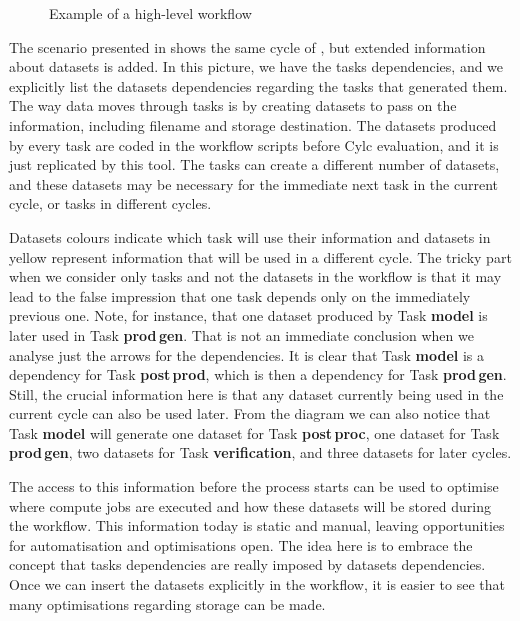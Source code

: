 \documentclass{superfri}
\begin{document}
\begin{figure}[b]
\begin{minipage}{.45\linewidth}
        \label{fig:cycle-io-dep}
    \end{minipage}
    \vspace{5pt}
    \caption{Example of a high-level workflow}
    \label{fig:cycle}
\end{figure}

The scenario presented in  shows the same cycle of , but  extended information about datasets is added.
In this picture, we have the tasks dependencies, and we explicitly list the datasets dependencies regarding the tasks that generated them.
The way data moves through tasks is by creating datasets to pass on the information, including filename and storage destination.
The datasets produced by every task are coded in the workflow scripts before Cylc evaluation, and it is just replicated by this tool. The tasks can create a different number of datasets, and these datasets may be necessary for the immediate next task in the current cycle, or tasks in different cycles.

Datasets colours indicate which task will use their information and datasets in yellow represent information that will be used in a different cycle. The tricky part when we consider only tasks and not the datasets in the workflow is that it may lead to the false impression that one task depends only on the immediately previous one. Note, for instance, that one dataset produced by Task \textbf{model} is later used in Task \textbf{prod\,gen}. That is not an immediate conclusion when we analyse just the arrows for the dependencies. It is clear that Task \textbf{model} is a dependency for Task \textbf{post\,prod}, which is then a dependency for Task \textbf{prod\,gen}. Still, the crucial information here is that any dataset currently being used in the current cycle can also be used later. From the diagram we can also notice that Task \textbf{model} will generate one dataset for Task \textbf{post\,proc}, one dataset for Task \textbf{prod\,gen}, two datasets for Task \textbf{verification}, and three datasets for later cycles.

The access to this information before the process starts can be used to optimise where compute jobs are executed and how these datasets will be stored during the workflow.
This information today is static and manual, leaving opportunities for automatisation and optimisations open.
The idea here is to embrace the concept that tasks dependencies are really imposed by datasets dependencies.
Once we can insert the datasets explicitly in the workflow, it is easier to see that many optimisations regarding storage can be made.
\end{document}
